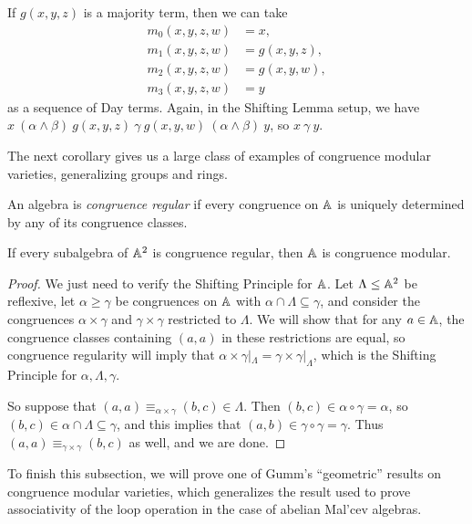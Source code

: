 \documentclass[letterpaper,11pt]{article}
\begin{document}
\begin{ex} If $g(x,y,z)$ is a majority term, then we can take
\begin{align*}
m_0(x,y,z,w) &= x,\\
m_1(x,y,z,w) &= g(x,y,z),\\
m_2(x,y,z,w) &= g(x,y,w),\\
m_3(x,y,z,w) &= y
\end{align*}
as a sequence of Day terms. Again, in the Shifting Lemma setup, we have $x\ (\alpha\wedge\beta)\ g(x,y,z)\ \gamma\ g(x,y,w)\ (\alpha\wedge\beta)\ y$, so $x\ \gamma\ y$.
\end{ex}

The next corollary gives us a large class of examples of congruence modular varieties, generalizing groups and rings.

\begin{defn} An algebra is \emph{congruence regular} if every congruence on $\mathbb{A}$ is uniquely determined by any of its congruence classes.
\end{defn}

\begin{cor} If every subalgebra of $\mathbb{A}^2$ is congruence regular, then $\mathbb{A}$ is congruence modular.
\end{cor}
\begin{proof} We just need to verify the Shifting Principle for $\mathbb{A}$. Let $\Lambda \le \mathbb{A}^2$ be reflexive, let $\alpha \ge \gamma$ be congruences on $\mathbb{A}$ with $\alpha \cap \Lambda \subseteq \gamma$, and consider the congruences $\alpha \times \gamma$ and $\gamma \times \gamma$ restricted to $\Lambda$. We will show that for any $a \in \mathbb{A}$, the congruence classes containing $(a,a)$ in these restrictions are equal, so congruence regularity will imply that $\alpha\times\gamma|_\Lambda = \gamma\times\gamma|_\Lambda$, which is the Shifting Principle for $\alpha,\Lambda,\gamma$.

So suppose that $(a,a) \equiv_{\alpha\times\gamma} (b,c) \in \Lambda$. Then $(b,c) \in \alpha \circ \gamma = \alpha$, so $(b,c) \in \alpha \cap \Lambda \subseteq \gamma$, and this implies that $(a,b) \in \gamma \circ \gamma = \gamma$. Thus $(a,a) \equiv_{\gamma\times\gamma} (b,c)$ as well, and we are done.
\end{proof}

To finish this subsection, we will prove one of Gumm's ``geometric'' results on congruence modular varieties, which generalizes the result used to prove associativity of the loop operation in the case of abelian Mal'cev algebras.
\end{document}
